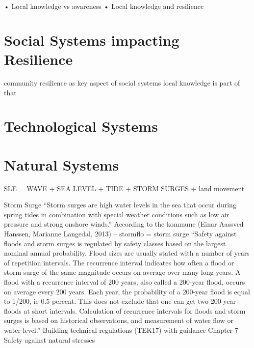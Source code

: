 \documentclass{article}
\begin{document}
•	Local knowledge vs awareness
•	Local knowledge and resilience 

\section{Social Systems impacting Resilience}
community resilience as key aspect of social systems
local knowledge is part of that

\section{Technological Systems}

\section{Natural Systems }
SLE = WAVE + SEA LEVEL + TIDE + STORM SURGES + land movement

Storm Surge
“Storm surges are high water levels in the sea that occur during spring tides in combination with special weather conditions such as low air pressure and strong onshore winds.” According to the kommune (Einar Aassved Hanssen, Marianne Langedal, 2013) – stormflo = storm surge
“Safety against floods and storm surges is regulated by safety classes based on the
largest nominal annual probability. Flood sizes are usually stated with a number of
years of repetition intervals. The recurrence interval indicates how often a flood or
storm surge of the same magnitude occurs on average over many long years. A flood
with a recurrence interval of 200 years, also called a 200-year flood, occurs on average
every 200 years. Each year, the probability of a 200-year flood is equal to 1/200, ie 0.5 percent.
This does not exclude that one can get two 200-year floods at short intervals.
Calculation of recurrence intervals for floods and storm surges is based on historical
observations, and measurement of water flow or water level.”
Building technical regulations (TEK17) with guidance Chapter 7 Safety against natural stresses
\end{document}
